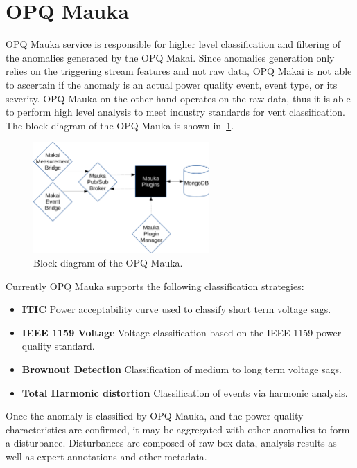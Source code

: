 \section{OPQ Mauka}\label{sec:opq-mauka}
OPQ Mauka service is responsible for higher level classification and filtering of the anomalies generated by the OPQ Makai.
Since anomalies generation only
relies on the triggering stream features and not raw data, OPQ Makai is not able to ascertain if the anomaly is an actual power quality event, event type, or its severity.
OPQ Mauka on the other hand operates on the raw data, thus it is able to perform high level analysis to meet industry standards for vent classification.
The block diagram of the OPQ Mauka is shown in~\ref{fig:opq:11}.
\begin{figure}[h]
  \begin{center}
  \includegraphics[width=0.6\textwidth]{img/mauka.pdf}
  \end{center}
  \caption{Block diagram of the OPQ Mauka.}
  \label{fig:opq:11}
\end{figure}

Currently OPQ Mauka supports the following classification strategies:
\begin{itemize}
	\item{\textbf{ITIC}} Power acceptability curve used to classify short term voltage sags.
	\item{\textbf{IEEE 1159 Voltage}} Voltage classification based on the IEEE 1159 power quality standard.
	\item{\textbf{Brownout Detection}} Classification of medium to long term voltage sags.
	\item{\textbf{Total Harmonic distortion}} Classification of events via harmonic analysis.
\end{itemize}

Once the anomaly is classified by OPQ Mauka, and the power quality characteristics are confirmed, it may be aggregated with other anomalies to form a disturbance.
Disturbances are composed of raw box data, analysis results as well as expert annotations and other metadata.

